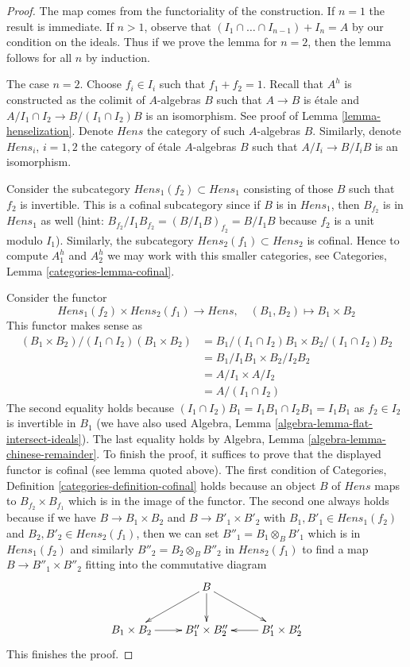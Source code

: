 \documentclass[10pt,a4paper]{amsart}
\theoremstyle{plain}
\theoremstyle{definition}
\theoremstyle{remark}
\numberwithin{equation}{subsection}
\begin{document}
\begin{proof}
The map comes from the functoriality of the construction.
If $n = 1$ the result is immediate. If $n > 1$, observe that
$(I_1 \cap \ldots \cap I_{n - 1}) + I_n = A$ by our condition
on the ideals. Thus if we prove the lemma for $n = 2$, then
the lemma follows for all $n$ by induction.

\medskip\noindent
The case $n = 2$. Choose $f_i \in I_i$ such that $f_1 + f_2 = 1$.
Recall that $A^h$ is constructed as the colimit of $A$-algebras $B$
such that $A \to B$ is \'etale and $A/I_1 \cap I_2 \to B/(I_1 \cap I_2)B$
is an isomorphism. See proof of Lemma \ref{lemma-henselization}.
Denote $Hens$ the category of such $A$-algebras $B$.
Similarly, denote $Hens_i$, $i = 1, 2$ the category of \'etale $A$-algebras
$B$ such that $A/I_i \to B/I_iB$ is an isomorphism.

\medskip\noindent
Consider the subcategory $Hens_1(f_2) \subset Hens_1$ consisting of
those $B$ such that $f_2$ is invertible. This is a cofinal subcategory
since if $B$ is in $Hens_1$, then $B_{f_2}$ is in $Hens_1$ as well
(hint: $B_{f_2}/I_1B_{f_2} = (B/I_1B)_{f_2} = B/I_1B$ because
$f_2$ is a unit modulo $I_1$). Similarly, the subcategory
$Hens_2(f_1) \subset Hens_2$ is cofinal. Hence to compute $A_1^h$ and
$A_2^h$ we may work with this smaller categories, see
Categories, Lemma \ref{categories-lemma-cofinal}.

\medskip\noindent
Consider the functor
$$
Hens_1(f_2) \times Hens_2(f_1) \to Hens,\quad (B_1, B_2) \mapsto B_1 \times B_2
$$
This functor makes sense as
\begin{align*}
(B_1 \times B_2)/(I_1 \cap I_2)(B_1 \times B_2)
& =
B_1/(I_1 \cap I_2)B_1 \times B_2/(I_1 \cap I_2)B_2 \\
& =
B_1/I_1B_1 \times B_2/I_2B_2 \\
& = A/I_1 \times A/I_2 \\
& = A/(I_1 \cap I_2)
\end{align*}
The second equality holds because
$(I_1 \cap I_2)B_1 = I_1B_1 \cap I_2B_1 = I_1B_1$ as $f_2 \in I_2$
is invertible in $B_1$
(we have also used Algebra, Lemma \ref{algebra-lemma-flat-intersect-ideals}).
The last equality holds by Algebra, Lemma \ref{algebra-lemma-chinese-remainder}.
To finish the proof, it suffices to prove that the displayed functor
is cofinal (see lemma quoted above).
The first condition of
Categories, Definition \ref{categories-definition-cofinal}
holds because an object $B$ of $Hens$ maps to $B_{f_2} \times B_{f_1}$
which is in the image of the functor. The second one always holds because
if we have $B \to B_1 \times B_2$ and $B \to B'_1 \times B'_2$ with
$B_1, B'_1 \in Hens_1(f_2)$ and $B_2, B'_2 \in Hens_2(f_1)$, then
we can set $B''_1 = B_1 \otimes_B B'_1$ which is in $Hens_1(f_2)$
and similarly $B''_2 = B_2 \otimes_B B''_2$ in $Hens_2(f_1)$
to find a map $B \to B''_1 \times B''_2$ fitting into the commutative diagram
$$
\xymatrix{
& B \ar[ld] \ar[d] \ar[rd] \\
B_1 \times B_2 \ar[r] & B_1'' \times B_2'' & B_1' \times B_2' \ar[l]
}
$$
This finishes the proof.
\end{proof}
\end{document}
